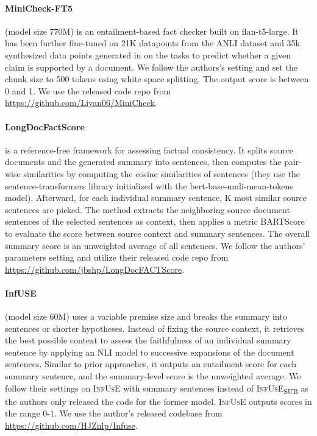 \paragraph{MiniCheck-FT5} (model size 770M) \cite{tang2024minicheck} is an entailment-based fact checker built on flan-t5-large. It has been further fine-tuned on 21K datapoints from the ANLI dataset \cite{nie2019adversarial} and 35k synthesized data points generated in \cite{tang2024minicheck} on the tasks to predict whether a given claim is supported by a document. We follow the authors's setting and set the chunk size to 500 tokens using white space splitting. The output score is between 0 and 1. We use the released code repo from \url{https://github.com/Liyan06/MiniCheck}.

\paragraph{LongDocFactScore} \cite{bishop-etal-2024-longdocfactscore-evaluating} is a reference-free framework for assessing factual consistency. It splits source documents and the generated summary into sentences, then computes the pair-wise similarities by computing the cosine similarities of sentences (they use the sentence-transformers library initialized with the bert-base-nmli-mean-tokens model). Afterward, for each individual summary sentence,  K most similar source sentences are picked.  The method extracts the neighboring source document sentences of the selected sentences as context, then applies a metric  BARTScore to evaluate the score between source context and summary sentences. The overall summary score is an unweighted average of all sentences. We follow the authors' parameters setting and utilize their released code repo from \url{https://github.com/jbshp/LongDocFACTScore}.

\paragraph{InfUSE} (model size 60M) \citet{zhang-etal-2024-fine} uses a variable premise size and breaks the summary into sentences or shorter hypotheses. Instead of fixing the source context, it retrieves the best possible context to assess the faithfulness of an individual summary sentence by applying an NLI model to successive expansions of the document sentences. Similar to prior approaches, it outputs an entailment score for each summary sentence, and the summary-level score is the unweighted average. We follow their settings on \textsc{InfUsE} with summary sentences instead of \textsc{InfUsE\textsubscript{SUB}} as the authors only released the code for the former model. \textsc{InfUsE} outputs scores in the range 0-1. We use the author's released codebase from \url{https://github.com/HJZnlp/Infuse}.
